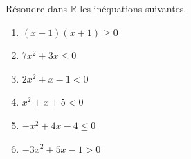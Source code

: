 \documentclass[a4paper,12pt]{article}
\begin{document}
% 
% 
% 
% 
% 
% 
% 
% 
% 
% 

\begin{exercice}[title=Exercice 14 \quad$\star\star$\quad\  {[Calculer]}]{}{}
Résoudre dans $\mathbb{R}$ les inéquations suivantes.
\begin{enumerate}
    \item \((x - 1)(x + 1) \geq 0\)
    \item \(7x^2 + 3x \leq 0\)
    \item \(2x^2 + x - 1 < 0\)
    \item \(x^2 + x + 5 < 0\)
    \item \(-x^2 + 4x - 4 \leq 0\)
    \item \(-3x^2 + 5x - 1 > 0\)
\end{enumerate}
\end{exercice}
\end{document}
